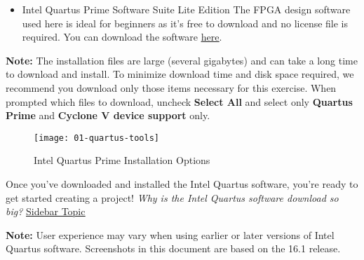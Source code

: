 \begin{flushleft}

\begin{itemize}

\item Intel Quartus Prime Software Suite Lite Edition
\newline
\newline
The FPGA design software used here is ideal for beginners as it's free to download and no license file is required. You can download the software \href{http://dl.altera.com/?edition=lite}{\underline{here}}.

\end{itemize}

\medskip

\begin{tcolorbox}[
	colback=MyMintedBGColor,
	colframe=MyMintedBGColor,
	]
\textbf{Note:} The installation files are large (several gigabytes) and can take a long time to download and install. To minimize download time and disk space required, we recommend you download only those items necessary for this exercise. When prompted which files to download, uncheck \textbf{Select All} and select only \textbf{Quartus Prime} and \textbf{Cyclone V device support} only.

\end{tcolorbox}

\begin{figure}[H]
\centering
\texttt{[image: 01-quartus-tools]}
\caption{Intel Quartus Prime Installation Options}
\label{fig:01-quartus-tools}
\end{figure}

Once you've downloaded and installed the Intel Quartus software, you're ready to get started creating a project!
\newline
\newline
\emph{Why is the Intel Quartus software download so big?} \hyperlink{side1}{\underline{Sidebar Topic}}
\newline

\begin{tcolorbox}[
	colback=MyMintedBGColor,
	colframe=MyMintedBGColor,
	]

\textbf{Note:} User experience may vary when using earlier or later versions of Intel Quartus software.  Screenshots in this document are based on the 16.1 release.

\end{tcolorbox}

\end{flushleft}

